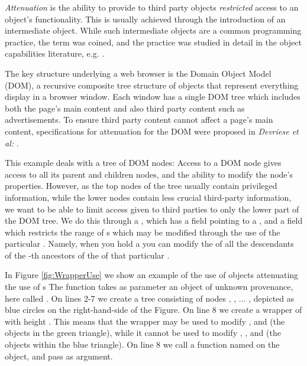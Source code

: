 \emph{Attenuation} is the ability to provide to third party objects \emph{restricted}  access to an object's functionality. This is usually achieved through the introduction of an intermediate object. While such intermediate objects are a common programming practice, 
the term was coined, and the practice  was studied in detail in the object capabilities literature,
e.g.  \cite{MillerPhD}. 

The key structure underlying a web browser is the Domain Object Model
(DOM), a recursive composite tree structure of objects that represent
everything display in a browser window.  Each window has a single DOM
tree which includes both the page's main content and also third party
content such as advertisements. To ensure third party content cannot
affect a page's main content,
specifications for attenuation for the DOM were proposed in
\textit{Devriese et al:}   \cite{dd}. 

This example deals with a tree of DOM nodes: Access to a DOM node
gives access to all its parent and children nodes, and the ability to
modify the node's properties. However, as the top nodes of the tree
usually contain privileged information, while the lower nodes contain
less crucial third-party information, we want to be able to limit  access given to third parties to only the lower part of the DOM tree. We do this through a , which has a field  pointing to a , and a field  which restricts the range of s which may be modified through the use of the particular . Namely, when you hold a   you can modify the  of all the descendants of the    -th ancestors of the  of that particular . %


In Figure \ref{fig:WrapperUse} we show an example of the use of   objects attenuating the use of s  The function  takes as parameter an object of unknown provenance, here called . On lines 2-7 we create  a tree consisting of nodes , , ... , depicted as blue circles on the   right-hand-side of the Figure. On line 8 we create a wrapper of  with height . This means that the wrapper  may be used to modify ,  and  (\ie the objects in the green triangle), while it cannot be used to modify , , and  (\ie the objects within the blue triangle). 
On line 8 we call a  function named  on the  object, and pass  as   argument. 

